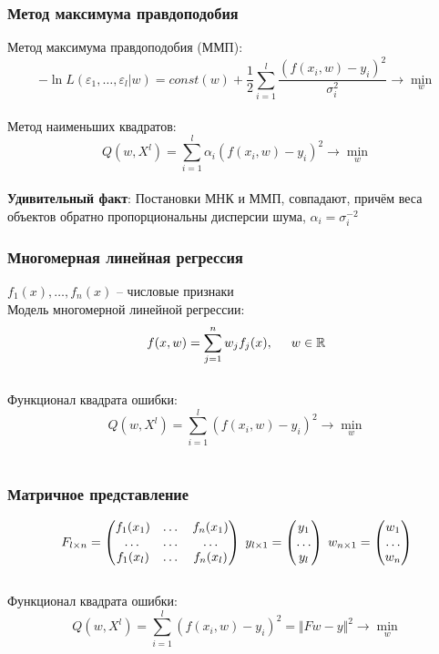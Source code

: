 \documentclass[10pt]{beamer}
\begin{document}
\begin{frame}\frametitle{Метод максимума правдоподобия}
Метод максимума правдоподобия (ММП):\\
$$- \ln L(\varepsilon_1, \dots, \varepsilon_l| w) = const(w) + \frac{1}{2} \sum\limits_{i=1}^l \frac{(f(x_i, w) - y_i)^2}{\sigma_i^2}  \rightarrow \min\limits_{w}$$\\
\vspace{2mm}
Метод наименьших квадратов: $$Q(w,X^l) = \sum\limits_{i=1}^l \alpha_i (f (x_i, w) - y_i)^2 \rightarrow \min\limits_{w}$$\\
\vspace{5mm}
\textbf{Удивительный факт}: Постановки МНК и ММП, совпадают, причём веса объектов
обратно пропорциональны дисперсии шума, $\alpha_i = \sigma_i^{-2}$
\end{frame}

\begin{frame}\frametitle{Многомерная линейная регрессия}
$f_1(x), \dots, f_n(x)$ -- числовые признаки\\
Модель многомерной линейной регрессии:\\
$$f (x, w) = \sum\limits_{j=1}^n w_j f_j(x), \hspace{5mm} w \in \mathbb{R}$$\\
\vspace{5mm}
Функционал квадрата ошибки:\\
$$Q(w,X^l) = \sum\limits_{i=1}^l (f (x_i, w) - y_i)^2  \rightarrow \min\limits_{w}$$\\

\end{frame}

\begin{frame}\frametitle{Матричное представление}
$$F_{l \times n} = \begin{pmatrix}
  f_1(x_1) & \dots & f_n(x_1) \\
  \dots & \dots & \dots\\
  f_1(x_l) & \dots & f_n(x_l)
 \end{pmatrix} \hspace{1mm} y_{l \times 1} = \begin{pmatrix}
  y_1 \\
  \dots\\
  y_l
 \end{pmatrix} \hspace{1mm} w_{n \times 1} = \begin{pmatrix}
  w_1 \\
  \dots\\
  w_n
 \end{pmatrix}$$ \\
\vspace{5mm}
Функционал квадрата ошибки:\\
$$Q(w,X^l) = \sum\limits_{i=1}^l (f (x_i, w) - y_i)^2  = \Vert Fw - y \Vert^2 \rightarrow \min\limits_{w}$$\\

\end{frame}
\end{document}
